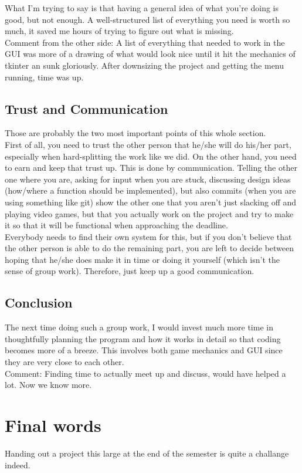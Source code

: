\documentclass[12pt]{scrartcl}
\begin{document}
	What I'm trying to say is that having a general idea of what you're doing is good, but not enough. A well-structured list of everything you need is worth so much, it saved me hours of trying to figure out what is missing.\\
	
	Comment from the other side: A list of everything that needed to work in the GUI was more of a drawing of what would look nice until it hit the mechanics of tkinter an sunk gloriously. After downsizing the project and getting the menu running, time was up.

	\subsection{Trust and Communication}
	Those are probably the two most important points of this whole section.\\

	First of all, you need to trust the other person that he/she will do his/her part, especially when hard-splitting the work like we did. On the other hand, you need to earn and keep that trust up. This is done by communication. Telling the other one where you are, asking for input when you are stuck, discussing design ideas (how/where a function should be implemented), but also commits (when you are using something like git) show the other one that you aren't just slacking off and playing video games, but that you actually work on the project and try to make it so that it will be functional when approaching the deadline.\\

	Everybody needs to find their own system for this, but if you don't believe that the other person is able to do the remaining part, you are left to decide between hoping that he/she does make it in time or doing it yourself (which isn't the sense of group work). Therefore, just keep up a good communication.

	\subsection{Conclusion}
	The next time doing such a group work, I would invest much more time in thoughtfully planning the program and how it works in detail so that coding becomes more of a breeze. This involves both game mechanics and GUI since they are very close to each other.\\
	Comment: Finding time to actually meet up and discuss, would have helped a lot. Now we know more.

	\section{Final words}\label{sec:final_words}
	Handing out a project this large at the end of the semester is quite a challange indeed.
\end{document}
